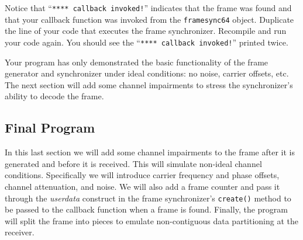 %
Notice that ``{\tt ***** callback invoked!}'' indicates that the frame
was found and that your callback function was invoked from the
{\tt framesync64} object.
Duplicate the line of your code that executes the frame synchronizer.
Recompile and run your code again.
You should see the ``{\tt ***** callback invoked!}'' printed twice.

Your program has only demonstrated the basic functionality of the frame
generator and synchronizer under ideal conditions:
no noise, carrier offsets, etc.
The next section will add some channel impairments to stress the
synchronizer's ability to decode the frame.


%
%
\subsection{Final Program}
\label{tutorial:framing:completed}

In this last section we will add some channel impairments to the frame
after it is generated and before it is received.
This will simulate non-ideal channel conditions.
Specifically we will introduce carrier frequency and phase offsets,
channel attenuation, and noise.
We will also add a frame counter and pass it through the {\em userdata}
construct in the frame synchronizer's {\tt create()} method to be passed
to the callback function when a frame is found.
Finally, the program will split the frame into pieces to emulate
non-contiguous data partitioning at the receiver.

